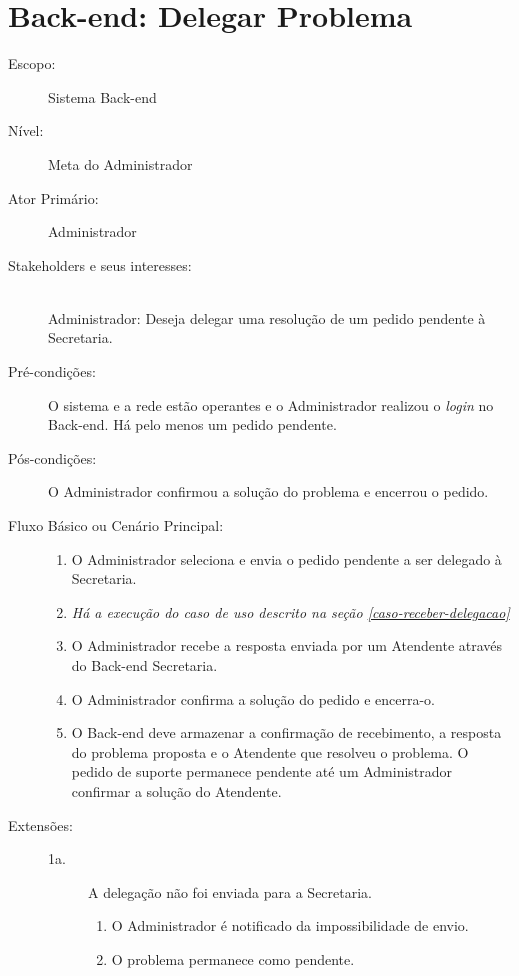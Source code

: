 \documentclass[brazil,times]{abnt}
\begin{document}
\section{Back-end: Delegar Problema}\label{delegar-problema}
\begin{description}
\item[Escopo:] Sistema Back-end
\item[Nível:] Meta do Administrador
\item[Ator Primário:] Administrador
\item[Stakeholders e seus interesses:] \hfill \\
Administrador: Deseja delegar uma resolução de um pedido pendente à Secretaria.

\item[Pré-condições:] O sistema e a rede estão operantes e o Administrador
realizou o \emph{login} no Back-end. Há pelo menos um pedido
pendente.

\item[Pós-condições:] O Administrador confirmou a solução do problema e encerrou
o pedido.
\item[Fluxo Básico ou Cenário Principal:]\hfill
\begin{enumerate}
  \item O Administrador seleciona e envia o pedido pendente a ser delegado à
  Secretaria.
  \item \emph{Há a execução do caso de uso descrito na seção
  \ref{caso-receber-delegacao}}
  \item O Administrador recebe a resposta enviada por um Atendente através do
  Back-end Secretaria.
  \item O Administrador confirma a solução do pedido e encerra-o.
  \item O Back-end deve armazenar a confirmação de recebimento, a resposta
  do problema proposta e o Atendente que resolveu o problema. O pedido de
  suporte permanece pendente até um Administrador confirmar a solução do Atendente.
\end{enumerate}

\item[Extensões:]\hfill
\begin{description}
	\item[1a.] A delegação não foi enviada para a Secretaria.
	\begin{enumerate}
		\item O Administrador é notificado da impossibilidade de envio.
		\item O problema permanece como pendente.
	\end{enumerate}


\end{description}
\end{description}
\end{document}
